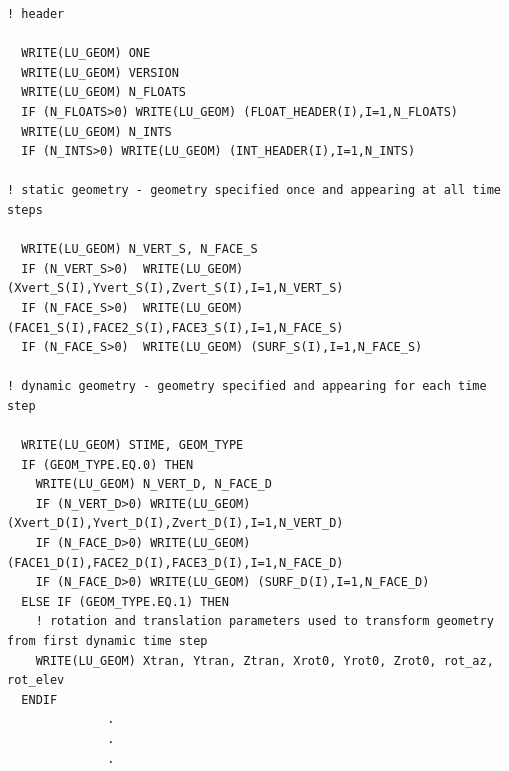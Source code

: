 \documentclass[11pt]{book}
\begin{document}
\footnotesize
\begin{verbatim}
! header

  WRITE(LU_GEOM) ONE
  WRITE(LU_GEOM) VERSION
  WRITE(LU_GEOM) N_FLOATS
  IF (N_FLOATS>0) WRITE(LU_GEOM) (FLOAT_HEADER(I),I=1,N_FLOATS)
  WRITE(LU_GEOM) N_INTS
  IF (N_INTS>0) WRITE(LU_GEOM) (INT_HEADER(I),I=1,N_INTS)

! static geometry - geometry specified once and appearing at all time steps

  WRITE(LU_GEOM) N_VERT_S, N_FACE_S
  IF (N_VERT_S>0)  WRITE(LU_GEOM) (Xvert_S(I),Yvert_S(I),Zvert_S(I),I=1,N_VERT_S)
  IF (N_FACE_S>0)  WRITE(LU_GEOM) (FACE1_S(I),FACE2_S(I),FACE3_S(I),I=1,N_FACE_S)
  IF (N_FACE_S>0)  WRITE(LU_GEOM) (SURF_S(I),I=1,N_FACE_S)

! dynamic geometry - geometry specified and appearing for each time step

  WRITE(LU_GEOM) STIME, GEOM_TYPE
  IF (GEOM_TYPE.EQ.0) THEN
    WRITE(LU_GEOM) N_VERT_D, N_FACE_D
    IF (N_VERT_D>0) WRITE(LU_GEOM) (Xvert_D(I),Yvert_D(I),Zvert_D(I),I=1,N_VERT_D)
    IF (N_FACE_D>0) WRITE(LU_GEOM) (FACE1_D(I),FACE2_D(I),FACE3_D(I),I=1,N_FACE_D)
    IF (N_FACE_D>0) WRITE(LU_GEOM) (SURF_D(I),I=1,N_FACE_D)
  ELSE IF (GEOM_TYPE.EQ.1) THEN
    ! rotation and translation parameters used to transform geometry from first dynamic time step
    WRITE(LU_GEOM) Xtran, Ytran, Ztran, Xrot0, Yrot0, Zrot0, rot_az, rot_elev
  ENDIF
              .
              .
              .
\end{verbatim}
\normalsize
\end{document}
